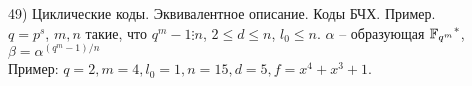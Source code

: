 49) Циклические коды. Эквивалентное описание. Коды БЧХ. Пример.\\
$q = p^s$, $m, n$ такие, что $q^m-1 \vdots n$, $2 \le d \le n$, $l_0 \le n$. $\alpha$ -- образующая ${\mathbb{F}_{q^m}}^*$, $\beta=\alpha^{(q^m-1)/n}$\\
Пример: $q=2, m=4, l_0=1, n=15, d=5, f=x^4+x^3+1$.\\
